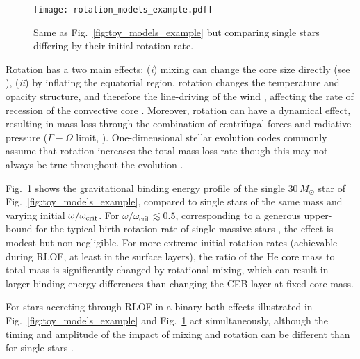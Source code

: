\documentclass[twocolumn,twocolappendix,trackchanges]{aastex63}
\DeclareRobustCommand{\Figref}[1]{Fig.~\ref{#1}}
\begin{document}
\begin{figure}[htbp]
  \centering
  \texttt{[image: rotation\_models\_example.pdf]}
  \caption{Same as \Figref{fig:toy_models_example} but comparing
    single stars differing by their initial rotation rate.}
  \label{fig:rotation_models_example}
\end{figure}

Rotation has a two main effects: (\emph{i}) mixing can change the core
size directly (see \citealt{heger:2000, maeder:00}), (\emph{ii}) by
inflating the equatorial region, rotation changes the temperature and
opacity structure, and therefore the line-driving of the wind
\cite[e.g.,][]{muller:2014, gagnier:2019}, affecting the
rate of recession of the convective core \citep[e.g.,][]{renzo:2017,
  renzo:2020ppi_conv}. Moreover, rotation can have a dynamical effect,
resulting in mass loss through the combination of centrifugal forces
and radiative pressure ($\Gamma-\Omega$ limit, \citealt{langer:1998}).
One-dimensional stellar evolution codes commonly assume that rotation
increases the total mass loss rate \citep[e.g.,][]{langer:1998,
  heger:2000} though this may not always be true throughout the
evolution \citep[e.g.,][]{gagnier:2019}.

\Figref{fig:rotation_models_example} shows the gravitational binding
energy profile of the single $30\,M_\odot$ star of
\Figref{fig:toy_models_example}, compared to single stars of the same
mass and varying initial $\omega/\omega_{\rm crit}$. %
For $\omega/\omega_\mathrm{crit}\lesssim 0.5$, corresponding to a
generous upper-bound for the typical birth rotation rate of single
massive stars \citep[e.g.,][]{ramirez-agudelo:2015}, the effect is
modest but non-negligible. For more extreme initial rotation rates
(achievable during RLOF, at least in the surface layers), the ratio of
the He core mass to total mass is significantly changed by rotational
mixing, which can result in larger binding energy differences than
changing the CEB layer at fixed core mass.


For stars accreting through RLOF in a binary both
effects illustrated in \Figref{fig:toy_models_example} and
\Figref{fig:rotation_models_example} act simultaneously, although the
timing and amplitude of the impact of mixing and rotation can be
different than for single stars \citep[e.g.,][]{renzo:2021zoph}.
\end{document}
